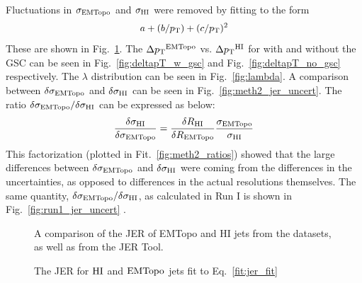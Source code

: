 Fluctuations in $\sigma_{\text{EMTopo}}$ and $\sigma_{\mathrm{HI}}$ were removed by fitting to the form
\begin{align}
a+(b/\mbox{$p_{\mathrm{T}}$})+(c/\mbox{$p_{\mathrm{T}}$})^2
\label{fit:jer_fit}
\end{align}
These are shown in Fig.~\ref{fig:fitted_jer}. The $\Delta\mbox{$p_{\mathrm{T}}$}^{\text{EMTopo}}$ vs. $\Delta\mbox{$p_{\mathrm{T}}$}^{\mathrm{HI}}$ for with and without the GSC can be seen in Fig.~\ref{fig:deltapT_w_gsc} and Fig.~\ref{fig:deltapT_no_gsc} respectively. The $\lambda$ distribution can be seen in Fig.~\ref{fig:lambda}. A comparison between $\delta\sigma_{\text{EMTopo}}$ and $\delta\sigma_{\mathrm{HI}}$ can be seen in Fig.~\ref{fig:meth2_jer_uncert}. The ratio $\delta\sigma_{\text{EMTopo}} / \delta\sigma_{\mathrm{HI}}$ can be expressed as below:
\begin{align}
\frac{\delta\sigma_{\mathrm{HI}}}{\delta\sigma_{\text{EMTopo}}} = \frac{\delta R_{\mathrm{HI}}}{\delta R_{\text{EMTopo}}} \frac{\sigma_{\text{EMTopo}}}{\sigma_{\mathrm{HI}}}
\end{align}
This factorization (plotted in Fit.~\ref{fig:meth2_ratios}) showed that the large differences between $\delta\sigma_{\text{EMTopo}}$ and $\delta\sigma_{\mathrm{HI}}$ were coming from the differences in the uncertainties, as opposed to differences in the actual resolutions themselves. The same quantity, $\delta\sigma_{\text{EMTopo}} / \delta\sigma_{\mathrm{HI}}$, as calculated in Run I is shown in Fig.~\ref{fig:run1_jer_uncert} \cite{xcalib_run1}.


\begin{figure}
	\centering
	\caption{A comparison of the JER of EMTopo and HI jets from the datasets, as well as from the JER Tool. }
	\label{fig:emtopo_jer}%

	\centering
	\caption{The JER for $\mathrm{HI}$ and $\text{EMTopo}$ jets fit to Eq.~\ref{fit:jer_fit}}
	\label{fig:fitted_jer}%
\end{figure}

